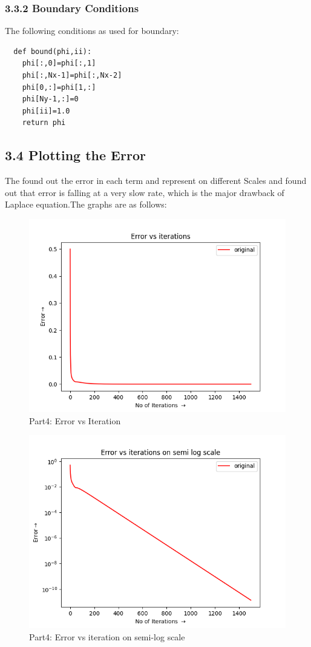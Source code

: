 \documentclass[12pt, a4paper]{report}
\begin{document}
  \subsubsection*{3.3.2 Boundary Conditions}
  The following conditions as used for boundary:
  \begin{verbatim}
  def bound(phi,ii):
    phi[:,0]=phi[:,1]                    
    phi[:,Nx-1]=phi[:,Nx-2]             
    phi[0,:]=phi[1,:]                
    phi[Ny-1,:]=0
    phi[ii]=1.0
    return phi
  \end{verbatim}
 
 \subsection*{3.4 Plotting the Error}
  The found out the error in each term and represent on different Scales and found out that error is falling at a very slow rate, which is the major drawback of Laplace equation.The graphs are as follows:
  \begin{figure}[H]
	\centering
	\includegraphics[scale=0.8]{Figure_2.png} 
	\caption{Part4: Error vs Iteration }
	\label{fig:2}
  \end{figure}
  \begin{figure}[H]
	\centering
	\includegraphics[scale=0.8]{Figure_3.png} 
	\caption{Part4: Error vs iteration on semi-log scale}
	\label{fig:3}
  \end{figure}
\end{document}
